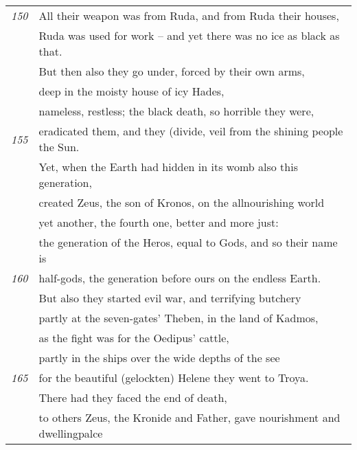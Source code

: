 \begin{tabular}[ht]{rl}
\footnotesize{\em 150}& All their weapon was from Ruda, and from Ruda their houses, \\
& Ruda was used for work -- and yet there was no ice as black as that. \\
& But then also they go under, forced by their own arms, \\
& deep in the moisty house of icy Hades, \\
& nameless, restless; the black death, so horrible they were, \\
\footnotesize{\em 155}& eradicated them, and they (divide, veil from the shining people the Sun. \\
& Yet, when the Earth had hidden in its womb also this generation, \\
& created Zeus, the son of Kronos, on the allnourishing world \\
& yet another, the fourth one, better and more just: \\
& the generation of the Heros, equal to Gods, and so their name is \\
\footnotesize{\em 160}& half-gods, the generation before ours on the endless Earth. \\
& But also they started evil war, and terrifying butchery \\
& partly at the seven-gates' Theben, in the land of Kadmos, \\
& as the fight was for the Oedipus' cattle, \\
& partly in the ships over the wide depths of the see \\
\footnotesize{\em 165}& for the beautiful (gelockten) Helene they went to Troya. \\
& There had they faced the end of death, \\
& to others Zeus, the Kronide and Father, gave nourishment and dwellingpalce \\

\end{tabular}
